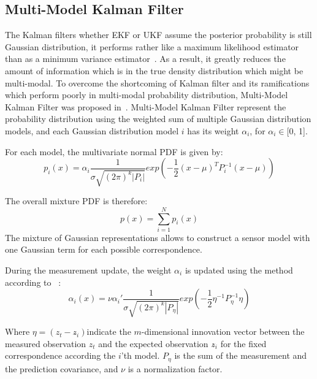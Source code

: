 \subsection{Multi-Model Kalman Filter}\label{sub:mmkalman}
The Kalman filters whether \gls{EKF} or \gls{UKF} assume the posterior probability is still Gaussian distribution, it performs rather like a maximum likelihood estimator than as a minimum variance estimator~\cite{alspach1972nonlinear}. As a result, it greatly reduces the amount of information which is in the true density distribution which might be multi-modal. To overcome the shortcoming of Kalman filter and its ramifications which perform poorly in multi-modal probability distribution, Multi-Model Kalman Filter was proposed in~\cite{alspach1972nonlinear}. Multi-Model Kalman Filter represent the probability distribution using the weighted sum of multiple Gaussian distribution models, and each Gaussian distribution model $i$ has its weight $\alpha_i$, for $\alpha_i \in $[0, 1].

For each model, the multivariate normal \gls{PDF} is given by:
\begin{equation}
\label{eq:mmkalman}
p_{i}(x) = \alpha_i\frac{1}{\sigma \sqrt {(2\pi)^k|P_i|}}exp(-\frac{1}{2}(x-\mu)^TP_i^{-1}(x-\mu))
\end{equation}

The overall mixture \gls{PDF} is therefore:
\begin{equation}
\label{eq:mmkalmansum}
p(x) = \sum_{i=1}^{N}p_i(x)
\end{equation}
The mixture of Gaussian representations allows to construct a sensor model with one Gaussian term for each possible correspondence.

During the measurement update, the weight $\alpha_i$ is updated using the method according to ~\cite{alspach1972nonlinear}:
\begin{equation}
\label{eq:weightupdate}
\alpha_{i}(x) = \nu\alpha_i'\frac{1}{\sigma \sqrt {(2\pi)^k|P_\eta|}}exp(-\frac{1}{2}\eta^{-1}P_\eta^{-1}\eta)
\end{equation}

Where $\eta = (z_t - z\widehat{}_i)$indicate the $m$-dimensional innovation vector between the measured observation $z_t$ and the expected observation $z\widehat{}_i$ for the fixed correspondence according the $i$'th model. $P_\eta$ is the sum of the measurement and the prediction covariance, and $\nu$ is a normalization factor.

